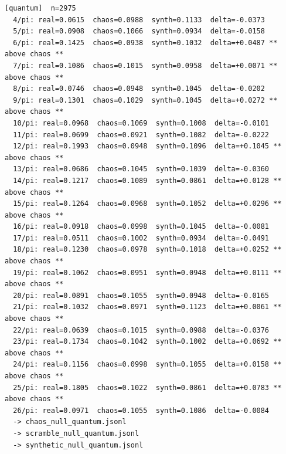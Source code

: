 \documentclass[11pt, letterpaper, openany]{book}
\begin{document}
\begin{empiricalbox}
\begin{lstlisting}[style=terminal]
[quantum]  n=2975
  4/pi: real=0.0615  chaos=0.0988  synth=0.1133  delta=-0.0373
  5/pi: real=0.0908  chaos=0.1066  synth=0.0934  delta=-0.0158
  6/pi: real=0.1425  chaos=0.0938  synth=0.1032  delta=+0.0487 ** above chaos **
  7/pi: real=0.1086  chaos=0.1015  synth=0.0958  delta=+0.0071 ** above chaos **
  8/pi: real=0.0746  chaos=0.0948  synth=0.1045  delta=-0.0202
  9/pi: real=0.1301  chaos=0.1029  synth=0.1045  delta=+0.0272 ** above chaos **
  10/pi: real=0.0968  chaos=0.1069  synth=0.1008  delta=-0.0101
  11/pi: real=0.0699  chaos=0.0921  synth=0.1082  delta=-0.0222
  12/pi: real=0.1993  chaos=0.0948  synth=0.1096  delta=+0.1045 ** above chaos **
  13/pi: real=0.0686  chaos=0.1045  synth=0.1039  delta=-0.0360
  14/pi: real=0.1217  chaos=0.1089  synth=0.0861  delta=+0.0128 ** above chaos **
  15/pi: real=0.1264  chaos=0.0968  synth=0.1052  delta=+0.0296 ** above chaos **
  16/pi: real=0.0918  chaos=0.0998  synth=0.1045  delta=-0.0081
  17/pi: real=0.0511  chaos=0.1002  synth=0.0934  delta=-0.0491
  18/pi: real=0.1230  chaos=0.0978  synth=0.1018  delta=+0.0252 ** above chaos **
  19/pi: real=0.1062  chaos=0.0951  synth=0.0948  delta=+0.0111 ** above chaos **
  20/pi: real=0.0891  chaos=0.1055  synth=0.0948  delta=-0.0165
  21/pi: real=0.1032  chaos=0.0971  synth=0.1123  delta=+0.0061 ** above chaos **
  22/pi: real=0.0639  chaos=0.1015  synth=0.0988  delta=-0.0376
  23/pi: real=0.1734  chaos=0.1042  synth=0.1002  delta=+0.0692 ** above chaos **
  24/pi: real=0.1156  chaos=0.0998  synth=0.1055  delta=+0.0158 ** above chaos **
  25/pi: real=0.1805  chaos=0.1022  synth=0.0861  delta=+0.0783 ** above chaos **
  26/pi: real=0.0971  chaos=0.1055  synth=0.1086  delta=-0.0084
  -> chaos_null_quantum.jsonl
  -> scramble_null_quantum.jsonl
  -> synthetic_null_quantum.jsonl


\end{lstlisting}
\end{empiricalbox}
\end{document}
